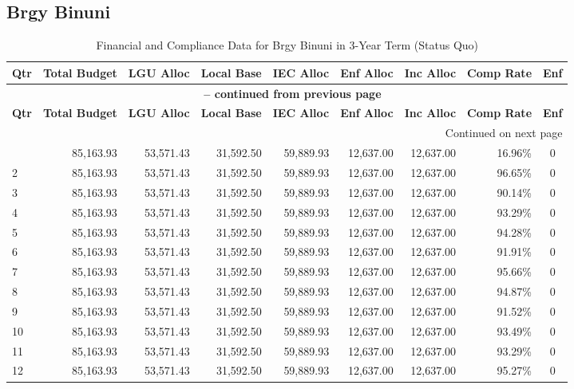 \subsection{Brgy Binuni}
\begin{longtable}{lrrrrrrrc}
\caption{Financial and Compliance Data for Brgy Binuni in 3-Year Term (Status Quo)} \\
\toprule
\textbf{Qtr} & \textbf{Total Budget} & \textbf{LGU Alloc} & \textbf{Local Base} & \textbf{IEC Alloc} & \textbf{Enf Alloc} & \textbf{Inc Alloc} & \textbf{Comp Rate} & \textbf{Enf} \\
\midrule
\endfirsthead
\multicolumn{9}{c}{{\bfseries \tablename\ \thetable{} -- continued from previous page}} \\
\toprule
\textbf{Qtr} & \textbf{Total Budget} & \textbf{LGU Alloc} & \textbf{Local Base} & \textbf{IEC Alloc} & \textbf{Enf Alloc} & \textbf{Inc Alloc} & \textbf{Comp Rate} & \textbf{Enf} \\
\midrule
\endhead
\hline \multicolumn{9}{r}{{Continued on next page}} \\ \hline
\endfoot
\bottomrule
\endlastfoot
1 & 85,163.93 & 53,571.43 & 31,592.50 & 59,889.93 & 12,637.00 & 12,637.00 & 16.96\% & 0 \\
2 & 85,163.93 & 53,571.43 & 31,592.50 & 59,889.93 & 12,637.00 & 12,637.00 & 96.65\% & 0 \\
3 & 85,163.93 & 53,571.43 & 31,592.50 & 59,889.93 & 12,637.00 & 12,637.00 & 90.14\% & 0 \\
4 & 85,163.93 & 53,571.43 & 31,592.50 & 59,889.93 & 12,637.00 & 12,637.00 & 93.29\% & 0 \\
5 & 85,163.93 & 53,571.43 & 31,592.50 & 59,889.93 & 12,637.00 & 12,637.00 & 94.28\% & 0 \\
6 & 85,163.93 & 53,571.43 & 31,592.50 & 59,889.93 & 12,637.00 & 12,637.00 & 91.91\% & 0 \\
7 & 85,163.93 & 53,571.43 & 31,592.50 & 59,889.93 & 12,637.00 & 12,637.00 & 95.66\% & 0 \\
8 & 85,163.93 & 53,571.43 & 31,592.50 & 59,889.93 & 12,637.00 & 12,637.00 & 94.87\% & 0 \\
9 & 85,163.93 & 53,571.43 & 31,592.50 & 59,889.93 & 12,637.00 & 12,637.00 & 91.52\% & 0 \\
10 & 85,163.93 & 53,571.43 & 31,592.50 & 59,889.93 & 12,637.00 & 12,637.00 & 93.49\% & 0 \\
11 & 85,163.93 & 53,571.43 & 31,592.50 & 59,889.93 & 12,637.00 & 12,637.00 & 93.29\% & 0 \\
12 & 85,163.93 & 53,571.43 & 31,592.50 & 59,889.93 & 12,637.00 & 12,637.00 & 95.27\% & 0 \\
\end{longtable}
\clearpage

